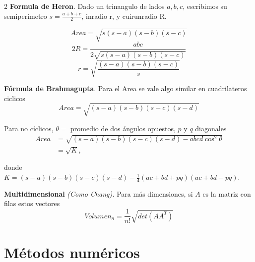\documentclass[10pt,spanish,mexico]{article}
\newcommand{\Pa}[1]{\left( #1 \right)}
\numberwithin{equation}{section}
\begin{document}
\begin{multicols}{2}
\textbf{Formula de Heron}. Dado un trinangulo de lados $a, b, c$, escribimos su semiperimetro $s = \frac{a+b+c}{2}$, inradio r, y cuirunradio R.

\begin{equation*}
    Area = \sqrt{s(s-a)(s-b)(s-c)}
\end{equation*}
\begin{equation*}
    2R = \frac{abc}{2  \sqrt{s(s-a)(s-b)(s-c)}}
\end{equation*}
\begin{equation*}
    r =  \sqrt{\frac{(s-a)(s-b)(s-c)}{s} }
\end{equation*}

\textbf{Fórmula de Brahmagupta}. Para el Area se vale algo similar en cuadrilateros ciclicos
\begin{equation*}
    Area = \sqrt{(s-a)(s-b)(s-c)(s-d)}
\end{equation*}

Para no cíclicos, $\theta=$ promedio de dos ángulos opuestos, $p$ y $q$ diagonales
\begin{align*}
    Area &= \sqrt{(s-a)(s-b)(s-c)(s-d)-abcd \cos^2\theta}\\
    &=\sqrt{K},
\end{align*}

donde $K = (s-a)(s-b)(s-c)(s-d) - \frac{1}{4}(ac+bd+pq)(ac+bd-pq)$.

\textbf{Multidimensional} \textit{(Como Chang).} Para más dimensiones, si $A$ es la matriz con filas estos vectores
\begin{equation*}
    Volumen_n = \frac{1}{n!} \sqrt{det\Pa{AA^T}}
\end{equation*}


\hrulefill
\section{Métodos numéricos}

\end{multicols}
\end{document}
